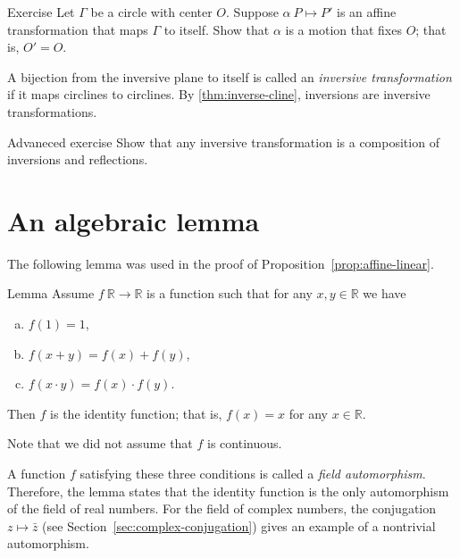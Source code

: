 \begin{thm}{Exercise}\label{ex:preserved-circle}
Let $\Gamma$ be a circle with center $O$.
Suppose $\alpha\:P\mapsto P'$ is an affine transformation that maps $\Gamma$ to itself.
Show that $\alpha$ is a motion that fixes $O$;
that is, $O'=O$.
\end{thm}

A bijection from the inversive plane to itself is called an \emph{inversive transformation} if it maps circlines to circlines.
By \ref{thm:inverse-cline},  inversions are  inversive transformations.

\begin{thm}{Advaneced exercise}\label{ex:inversions-inversive}
Show that any inversive transformation is a composition of inversions and reflections.
\end{thm}



\section{An algebraic lemma}

The following lemma was used in the proof of Proposition~\ref{prop:affine-linear}.

\begin{thm}{Lemma}\label{lem:R-auto}
Assume $f\:\mathbb{R}\to\mathbb{R}$ is a function such that for any $x,y\in\mathbb{R}$ we have
\begin{enumerate}[(a)]
\item\label{lem:R-auto:a} $f(1)=1$,
\item\label{lem:R-auto:b} $f(x+y)=f(x)+f(y)$,
\item\label{lem:R-auto:c} $f(x\cdot y)=f(x)\cdot f(y)$.
\end{enumerate}

Then $f$ is the identity function; that is,
$f(x)=x$ for any $x\in \mathbb{R}$.
\end{thm}

Note that we did not assume that $f$ is continuous.

A function $f$ satisfying these three conditions
is called a \emph{field automorphism}.
Therefore, the lemma states that the identity function is the only automorphism of the field of real numbers.
For the field of complex numbers, the conjugation $z\mapsto\bar z$ (see Section~\ref{sec:complex-conjugation}) gives an example of a nontrivial automorphism.

